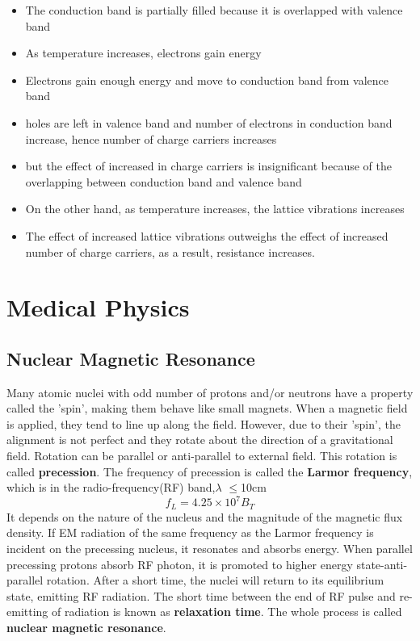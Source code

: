 \documentclass{article}
\begin{document}
 \begin{tcolorbox}[colframe=black!20!white,title=\color{red}{****Explain why as temperature increases, the electrical conductivity of a conductor(metal) decreases/ resistance of a conductors(metal) increases. (5-7m)}]
\begin{itemize}
\color{red}
    \item The conduction band is partially filled because it is overlapped with valence band
    \item As temperature increases, electrons gain energy
    \item Electrons gain enough energy and move to conduction band from valence band
    \item holes are left in valence band and number of electrons in conduction band increase, hence number of charge carriers increases
    \item but the effect of increased in charge carriers is insignificant because of the overlapping between conduction band and valence band
    \item On the other hand, as temperature increases, the lattice vibrations increases
    \item The effect of increased lattice vibrations outweighs the effect of increased number of charge carriers, as a result, resistance increases.
\end{itemize}
\end{tcolorbox}
 
 
 
 \newpage
 \section{Medical Physics}

 
\subsection{Nuclear Magnetic Resonance}


Many atomic nuclei with odd number of protons and/or neutrons have a property called the 'spin', making them behave like small magnets. When a magnetic field is applied, they tend to line up along the field. However, due to their 'spin', the alignment is not perfect and they rotate about the direction of a gravitational field. Rotation can be parallel or anti-parallel to external field.  This rotation is called \textbf{precession}. The frequency of precession is called the \textbf{Larmor frequency}, which is in the radio-frequency(RF) band,$\lambda$ $\leq$10cm 
$$f_L=4.25\times 10^7 B_T$$
It depends on the nature of the nucleus and the magnitude of the magnetic flux density. 
If EM radiation of the same frequency as the Larmor frequency is incident on the precessing nucleus, it resonates and absorbs energy. When parallel precessing protons absorb RF photon, it is promoted to higher energy state-anti-parallel rotation. After a short time, the nuclei will return to its equilibrium state, emitting RF radiation. The short time between the end of RF pulse and re-emitting of radiation is known as \textbf{relaxation time}. The whole process is called \textbf{nuclear magnetic resonance}.
\end{document}
